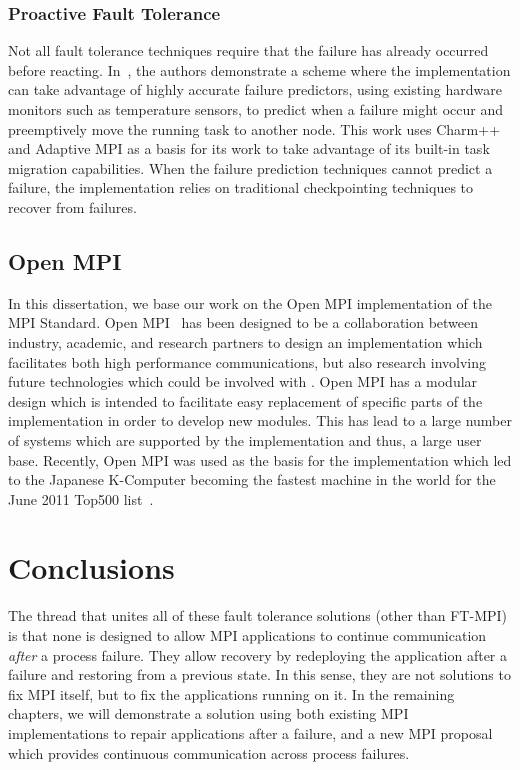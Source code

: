 \subsubsection{Proactive Fault Tolerance}

Not all fault tolerance techniques require that the failure has already occurred before 
reacting. In~\cite{Chakravorty:2006tj}, the authors demonstrate a scheme where the \mpi 
implementation can take advantage of highly accurate failure predictors, using existing hardware 
monitors such as temperature sensors, to predict when a failure might occur and 
preemptively move the running task to another node. This work uses Charm++ and Adaptive 
MPI as a basis for its work to take advantage of its built-in task migration 
capabilities. When the failure prediction techniques cannot predict a failure, the 
implementation relies on traditional checkpointing techniques to recover from failures.

\subsection{Open MPI}

In this dissertation, we base our work on the Open MPI implementation of the MPI Standard. 
Open MPI~\cite{openmpi, Gabriel:2004ub} has been designed to be a collaboration between 
industry, academic, and research partners to design an \mpi implementation which 
facilitates both high performance communications, but also research involving future 
technologies which could be involved with \mpi. Open MPI has a modular design which is 
intended to facilitate easy replacement of specific parts of the implementation in 
order to develop new modules. This has lead to a large number of systems which are 
supported by the implementation and thus, a large user base. Recently, Open MPI was used 
as the basis for the \mpi implementation which led to the Japanese K-Computer becoming 
the fastest machine in the world for the June 2011 Top500 list~\cite{June11Top500}.

\section{Conclusions}

The thread that unites all of these fault tolerance solutions (other than 
FT-MPI) is that none is designed to allow MPI applications to continue 
communication \textit{after} a process failure. They allow recovery by 
redeploying the application after a failure and restoring from a previous state. 
In this sense, they are not solutions to fix MPI itself, but to fix the 
applications running on it. In the remaining chapters, we will demonstrate a 
solution using both existing MPI implementations to repair applications after a 
failure, and a new MPI proposal which provides continuous communication 
across process failures.
